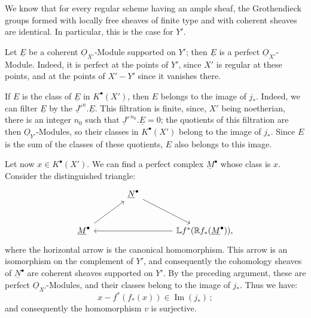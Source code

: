 %
We know that for every regular scheme having an ample sheaf, the Grothendieck groups formed with locally free sheaves of finite type and with coherent sheaves are identical. In particular, this is the case for \(Y'\).

Let \(\underline{E}\) be a coherent \(\underline{O}_{X'}\)-Module supported on \(Y'\); then \(\underline{E}\) is a perfect \(\underline{O}_{X'}\)-Module. Indeed, it is perfect at the points of \(Y'\), since \(X'\) is regular at these points, and at the points of \(X'-Y'\) since it vanishes there.

If \(E\) is the class of \(\underline{E}\) in \(K^{\bullet}(X')\), then \(E\) belongs to the image of \(j_*\). Indeed, we can filter \(\underline{E}\) by the \(\underline{J}'^n.\underline{E}\). This filtration is finite, since, \(X'\) being noetherian, there is an integer \(n_0\) such that \(\underline{J}'^{\,n_0}.\underline{E}=0\); the quotients of this filtration are then \(\underline{O}_{Y'}\)-Modules, so their classes in \(K^{\bullet}(X')\) belong to the image of \(j_*\). Since \(E\) is the sum of the classes of these quotients, \(E\) also belongs to this image.

Let now \(x\in K^{\bullet}(X')\). We can find a perfect complex \(\underline{M}^\bullet\) whose class is \(x\). Consider the distinguished triangle:
\[
\begin{tikzcd}[column sep=large,row sep=large]
& \underline{N}^\bullet \arrow[dr] &\\
\underline{M}^\bullet \arrow[ur] && \mathbb Lf^*(\mathbb Rf_*(\underline{M}^\bullet)) \arrow[ll] ,
\end{tikzcd}
\]
where the horizontal arrow is the canonical homomorphism. This arrow is an isomorphism on the complement of \(Y'\), and consequently the cohomology sheaves of \(\underline{N}^\bullet\) are coherent sheaves supported on \(Y'\). By the preceding argument, these are perfect \(\underline{O}_{X'}\)-Modules, and their classes belong to the image of \(j_*\). Thus we have:
\[
x-f^*(f_*(x))\in\operatorname{Im}(j_*)\,;
\]
and consequently the homomorphism \(v\) is surjective.



\providecommand{\Q}{\mathbb Q}
\providecommand{\bfP}{\mathbf P}
\providecommand{\gr}{\operatorname{gr}}
\providecommand{\Id}{\operatorname{Id}}
\providecommand{\Fil}{\operatorname{Fil}}
\providecommand{\Imf}{\operatorname{Im}}
\providecommand{\rank}{\operatorname{rank}}
\providecommand{\codim}{\operatorname{codim}}
\providecommand{\cJ}{\mathcal J}
\providecommand{\cI}{\mathcal I}
\providecommand{\cN}{\mathcal N}
\providecommand{\cE}{\mathcal E}
\providecommand{\cO}{\mathcal O}




